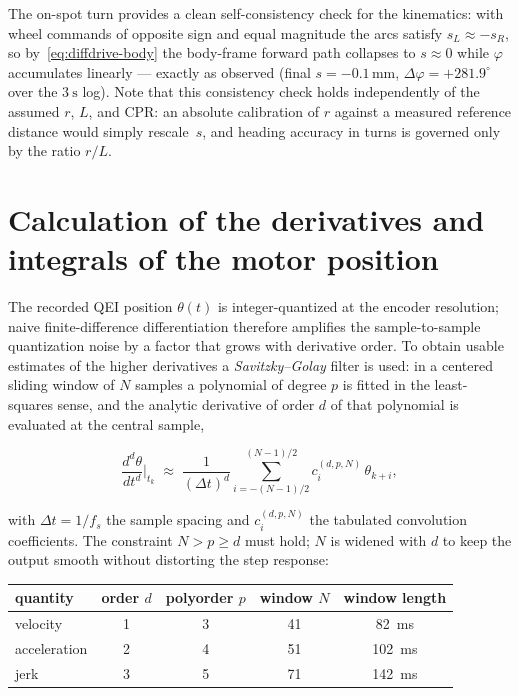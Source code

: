 \documentclass[12pt, oneside, a4paper]{scrreprt}
\begin{document}
            The on-spot turn provides a clean self-consistency check for the kinematics: with wheel commands of opposite sign and equal magnitude the arcs satisfy $s_L \approx -s_R$, so by~\eqref{eq:diffdrive-body} the body-frame forward path collapses to $s \approx 0$ while $\varphi$ accumulates linearly --- exactly as observed (final $s = -0.1\,\mathrm{mm}$, $\Delta\varphi = +281.9^{\circ}$ over the $\SI{3}{\second}$ log). Note that this consistency check holds independently of the assumed $r$, $L$, and $\mathrm{CPR}$: an absolute calibration of $r$ against a measured reference distance would simply rescale~$s$, and heading accuracy in turns is governed only by the ratio $r/L$.

        \section{Calculation of the derivatives and integrals of the motor position}\label{sec:derivative-chain}

            The recorded QEI position $\theta(t)$ is integer-quantized at the encoder resolution; naive finite-difference differentiation therefore amplifies the sample-to-sample quantization noise by a factor that grows with derivative order. To obtain usable estimates of the higher derivatives a \emph{Savitzky--Golay} filter is used: in a centered sliding window of $N$ samples a polynomial of degree $p$ is fitted in the least-squares sense, and the analytic derivative of order $d$ of that polynomial is evaluated at the central sample,

            \begin{equation}
                \frac{d^{d}\theta}{dt^{d}}\bigg|_{t_k}
                \;\approx\;
                \frac{1}{(\Delta t)^{d}} \sum_{i=-(N-1)/2}^{(N-1)/2} c_i^{(d,p,N)}\,\theta_{k+i},
                \label{eq:savgol}
            \end{equation}

            with $\Delta t = 1/f_s$ the sample spacing and $c_i^{(d,p,N)}$ the tabulated convolution coefficients. The constraint $N > p \ge d$ must hold; $N$ is widened with $d$ to keep the output smooth without distorting the step response:

            \begin{center}\footnotesize
                \begin{tabular}{lcccc}
                    \hline
                    quantity & order $d$ & polyorder $p$ & window $N$ & window length \\
                    \hline
                    velocity     & 1 & 3 & 41 & \SI{82}{\milli\second}  \\
                    acceleration & 2 & 4 & 51 & \SI{102}{\milli\second} \\
                    jerk         & 3 & 5 & 71 & \SI{142}{\milli\second} \\
                    \hline
                \end{tabular}
            \end{center}
\end{document}
